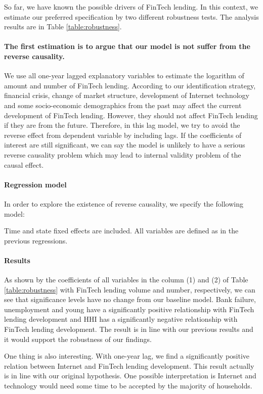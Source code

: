 \documentclass[11pt, a4paper, leqno]{article}
\begin{document}
So far, we have known the possible drivers of FinTech lending. In this context, we estimate our preferred specification by two different robustness tests. The analysis results are in Table \ref{table:robustness}. 

\paragraph{The first estimation is to argue that our model is not suffer from the reverse causality.} 
We use all one-year lagged explanatory variables to estimate the logarithm of amount and number of FinTech lending. According to our identification strategy, financial crisis, change of market structure, development of Internet technology and some socio-economic demographics from the past may affect the current development of FinTech lending. However, they should not affect FinTech lending if they are from the future. Therefore, in this lag model, we try to avoid the reverse effect from dependent variable by including lags. If the coefficients of interest are still significant, we can say the model is unlikely to have a serious reverse causality problem which may lead to internal validity problem of the causal effect.

\paragraph{Regression model} 
In order to explore the existence of reverse causality, we specify the following model:

Time and state fixed effects are included. All variables are defined as in the previous regressions.

\paragraph{Results}
As shown by the coefficients of all variables in the column (1) and (2) of Table \ref{table:robustness} with FinTech lending volume and number, respectively, we can see that significance levels have no change from our baseline model. Bank failure, unemployment and young have a significantly positive relationship with FinTech lending development and HHI has a significantly negative relationship with FinTech lending development. The result is in line with our previous results and it would support the robustness of our findings.

One thing is also interesting. With one-year lag, we find a significantly positive relation between Internet and FinTech lending development. This result actually is in line with our original hypothesis. One possible interpretation is Internet and technology would need some time to be accepted by the majority of households.
\end{document}
